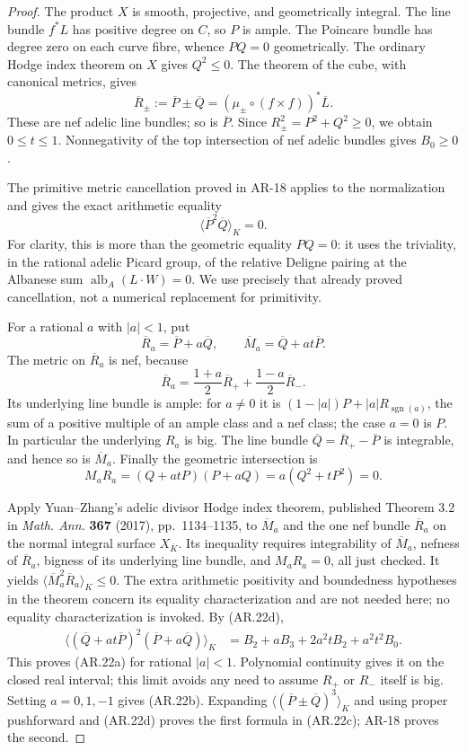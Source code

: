 \documentclass[11pt,a4paper]{article}
\begin{document}
\begin{proof}
The product $X$ is smooth, projective, and geometrically integral.
The line bundle $f^*L$ has positive degree on $C$, so $P$ is ample.
The Poincare bundle has degree zero on each curve fibre, whence
$PQ=0$ geometrically.  The ordinary Hodge index theorem on $X$ gives
$Q^2\le0$.  The theorem of the cube, with canonical metrics, gives
\[
 \overline R_\pm:=\overline P\pm\overline Q
       =(\mu_\pm\circ(f\times f))^*\overline L.
\]
These are nef adelic line bundles; so is $\overline P$.  Since
$R_\pm^2=P^2+Q^2\ge0$, we obtain $0\le t\le1$.
Nonnegativity of the top intersection of nef adelic bundles gives
$B_0\ge0$.

The primitive metric cancellation proved in AR-18 applies to the
normalization and gives the exact arithmetic equality
\[
 \langle\overline P^2\overline Q\rangle_K=0.       \tag{AR.22d}
\]
For clarity, this is more than the geometric equality $PQ=0$: it
uses the triviality, in the rational adelic Picard group, of the
relative Deligne pairing at the Albanese sum
$\operatorname{alb}_A(L\cdot W)=0$.  We use precisely that already
proved cancellation, not a numerical replacement for primitivity.

For a rational $a$ with $|a|<1$, put
\[
 \overline R_a=\overline P+a\overline Q,
 \qquad \overline M_a=\overline Q+at\overline P.
\]
The metric on $\overline R_a$ is nef, because
\[
 \overline R_a=\frac{1+a}{2}\overline R_+
                    +\frac{1-a}{2}\overline R_-.
\]
Its underlying line bundle is ample: for $a\ne0$ it is
$(1-|a|)P+|a|R_{\operatorname{sgn}(a)}$, the sum of a positive
multiple of an ample class and a nef class; the case $a=0$ is $P$.
In particular the underlying $R_a$ is big.  The line bundle
$\overline Q=\overline R_+-\overline P$ is integrable, and hence
so is $\overline M_a$.  Finally the geometric intersection is
\[
 M_aR_a=(Q+atP)(P+aQ)=a(Q^2+tP^2)=0.
\]

Apply Yuan--Zhang's adelic divisor Hodge index theorem, published
Theorem 3.2 in \emph{Math. Ann.} \textbf{367} (2017), pp.~1134--1135,
to $\overline M_a$ and the one nef bundle $\overline R_a$ on the
normal integral surface $X_{\overline K}$.  Its inequality requires
integrability of $\overline M_a$, nefness of $\overline R_a$, bigness
of its underlying line bundle, and $M_aR_a=0$, all just checked.
It yields
$\langle\overline M_a^2\overline R_a\rangle_K\le0$.
The extra arithmetic positivity and boundedness hypotheses in the
theorem concern its equality characterization and are not needed
here; no equality characterization is invoked.  By (AR.22d),
\[
 \begin{split}
 \langle(\overline Q+at\overline P)^2
                     (\overline P+a\overline Q)\rangle_K
 &=B_2+aB_3+2a^2tB_2+a^2t^2B_0.
 \end{split}
\]
This proves (AR.22a) for rational $|a|<1$.  Polynomial continuity
gives it on the closed real interval; this limit avoids any need to
assume $R_+$ or $R_-$ itself is big.  Setting $a=0,1,-1$ gives
(AR.22b).  Expanding $\langle(\overline P\pm\overline Q)^3\rangle_K$
and using proper pushforward and (AR.22d) proves the first formula
in (AR.22c); AR-18 proves the second.
\end{proof}
\end{document}
